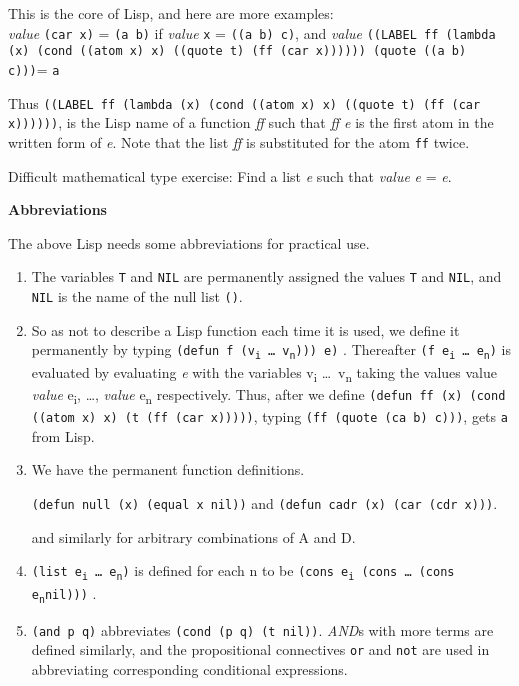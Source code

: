 \documentclass[8pt,letter,twocolumn]{article}
\newcommand{\args}[1] {#1\textsubscript{i} \dots \ #1\textsubscript{n}}
\newcommand{\ei}[0] {e\textsubscript{i}}
\newcommand{\en}[0] {e\textsubscript{n}}
\begin{document}
This is the core of Lisp, and here are more examples:  \\

\textit{value} \texttt{(car x)} = \texttt{(a b)} if \textit{value} \texttt{x} =
\texttt{((a b) c)}, and \textit{value} \texttt{((LABEL ff (lambda (x) (cond
  ((atom x) x) ((quote t) (ff (car x)))))) (quote ((a b) c)))}= \texttt{a}

Thus \texttt{((LABEL ff (lambda (x) (cond ((atom x) x) ((quote t) (ff (car
  x))))))}, is the Lisp name of a function \textit{ff} such that \textit{ff e}
is the first atom in the written form of \textit{e}. Note that the list
\textit{ff} is substituted for the atom \texttt{ff} twice.

Difficult mathematical type exercise: Find a list \textit{e} such that
\textit{value} \textit{e} = \textit{e}.

\vspace*{1\baselineskip}
\textbf{Abbreviations}
\vspace*{1\baselineskip}

The above Lisp needs some abbreviations for practical use.

\begin{enumerate}
\setlength\itemsep{0em}

\item The variables \texttt{T} and \texttt{NIL} are permanently assigned the
  values \texttt{T} and \texttt{NIL}, and \texttt{NIL} is the name of the null
  list \texttt{()}.

\item So as not to describe a Lisp function each time it is used, we define it
  permanently by typing \texttt{(defun f (\args{v}))) e)} . Thereafter
  \texttt{(f \args{e})} is evaluated by evaluating \textit{e} with the variables
  \args{v} taking the values value \textit{value} \ei, \dots, \textit{value} \en
  respectively. Thus, after we define \texttt{(defun ff (x) (cond ((atom x) x)
    (t (ff (car x)))))}, typing \texttt{(ff (quote (ca b) c)))}, gets \texttt{a}
  from Lisp.

\item We have the permanent function definitions.

  \texttt{(defun null (x) (equal x nil))} and \texttt{(defun cadr (x) (car (cdr
    x)))}.

  and similarly for arbitrary combinations of A and D.

\item \texttt{(list \args{e})} is defined for each n to be \texttt{(cons \ei
    (cons \dots \ (cons \en nil)))} .

\item \texttt{(and p q)} abbreviates \texttt{(cond (p q) (t nil))}.
  \textit{AND}s with more terms are defined similarly, and the propositional
  connectives \texttt{or} and \texttt{not} are used in abbreviating
  corresponding conditional expressions.

\end{enumerate}
\end{document}
